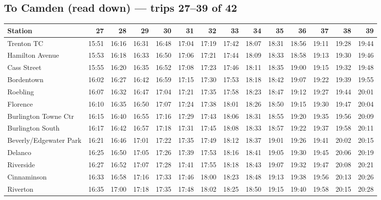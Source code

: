 \subsection*{To Camden (read down) --- trips 27--39 of 42}
\begin{center}\footnotesize\setlength{\tabcolsep}{3pt}\begin{tabular}{@{}lrrrrrrrrrrrrr@{}}\toprule
Station & 27 & 28 & 29 & 30 & 31 & 32 & 33 & 34 & 35 & 36 & 37 & 38 & 39 \\\midrule
Trenton TC & 15:51 & 16:16 & 16:31 & 16:48 & 17:04 & 17:19 & 17:42 & 18:07 & 18:31 & 18:56 & 19:11 & 19:28 & 19:44 \\
Hamilton Avenue & 15:53 & 16:18 & 16:33 & 16:50 & 17:06 & 17:21 & 17:44 & 18:09 & 18:33 & 18:58 & 19:13 & 19:30 & 19:46 \\
Cass Street & 15:55 & 16:20 & 16:35 & 16:52 & 17:08 & 17:23 & 17:46 & 18:11 & 18:35 & 19:00 & 19:15 & 19:32 & 19:48 \\
Bordentown & 16:02 & 16:27 & 16:42 & 16:59 & 17:15 & 17:30 & 17:53 & 18:18 & 18:42 & 19:07 & 19:22 & 19:39 & 19:55 \\
Roebling & 16:07 & 16:32 & 16:47 & 17:04 & 17:21 & 17:35 & 17:58 & 18:23 & 18:47 & 19:12 & 19:27 & 19:44 & 20:01 \\
Florence & 16:10 & 16:35 & 16:50 & 17:07 & 17:24 & 17:38 & 18:01 & 18:26 & 18:50 & 19:15 & 19:30 & 19:47 & 20:04 \\
Burlington Towne Ctr & 16:15 & 16:40 & 16:55 & 17:16 & 17:29 & 17:43 & 18:06 & 18:31 & 18:55 & 19:20 & 19:35 & 19:56 & 20:09 \\
Burlington South & 16:17 & 16:42 & 16:57 & 17:18 & 17:31 & 17:45 & 18:08 & 18:33 & 18:57 & 19:22 & 19:37 & 19:58 & 20:11 \\
Beverly/Edgewater Park & 16:21 & 16:46 & 17:01 & 17:22 & 17:35 & 17:49 & 18:12 & 18:37 & 19:01 & 19:26 & 19:41 & 20:02 & 20:15 \\
Delanco & 16:25 & 16:50 & 17:05 & 17:26 & 17:39 & 17:53 & 18:16 & 18:41 & 19:05 & 19:30 & 19:45 & 20:06 & 20:19 \\
Riverside & 16:27 & 16:52 & 17:07 & 17:28 & 17:41 & 17:55 & 18:18 & 18:43 & 19:07 & 19:32 & 19:47 & 20:08 & 20:21 \\
Cinnaminson & 16:33 & 16:58 & 17:16 & 17:33 & 17:46 & 18:00 & 18:23 & 18:48 & 19:13 & 19:38 & 19:56 & 20:13 & 20:26 \\
Riverton & 16:35 & 17:00 & 17:18 & 17:35 & 17:48 & 18:02 & 18:25 & 18:50 & 19:15 & 19:40 & 19:58 & 20:15 & 20:28 \\

\end{tabular}
\end{center}

